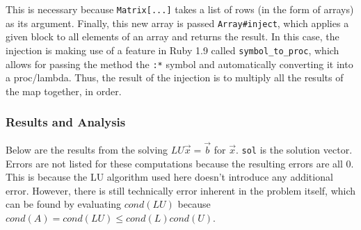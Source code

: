 \documentclass[letterpaper,12pt]{article}
\begin{document}
This is necessary because \texttt{Matrix[...]} takes a list of rows (in the
form of arrays) as its argument.
Finally, this new array is passed \texttt{Array\#inject}, which applies a given
block to all elements of an array and returns the result.
In this case, the injection is making use of a feature in Ruby 1.9 called
\texttt{symbol\_to\_proc}, which allows for passing the method the \texttt{:*}
symbol and automatically converting it into a proc/lambda.
Thus, the result of the injection is to multiply all the results of the map
together, in order.
\\
\subsubsection{Results and Analysis}

Below are the results from the solving $LU\vec{x} = \vec{b}$ for $\vec{x}$.
\texttt{sol} is the solution vector.
Errors are not listed for these computations because the resulting errors are
all 0.
This is because the LU algorithm used here doesn't introduce any additional
error.
However, there is still technically error inherent in the problem itself,
which can be found by evaluating $cond{(LU)}$ because $cond(A) = cond(LU) \le cond(L) cond(U)$.
\end{document}
